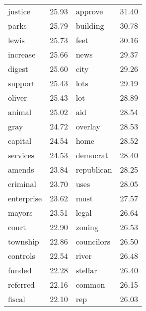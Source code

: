 \begin{table}[ht]
\begin{tabular}{lrlr}
  justice & 25.93 & approve & 31.40 \\ 
  parks & 25.79 & building & 30.78 \\ 
  lewis & 25.73 & feet & 30.16 \\ 
  increase & 25.66 & news & 29.37 \\ 
  digest & 25.60 & city & 29.26 \\ 
  support & 25.43 & lots & 29.19 \\ 
  oliver & 25.43 & lot & 28.89 \\ 
  animal & 25.02 & aid & 28.54 \\ 
  gray & 24.72 & overlay & 28.53 \\ 
  capital & 24.54 & home & 28.52 \\ 
  services & 24.53 & democrat & 28.40 \\ 
  amends & 23.84 & republican & 28.25 \\ 
  criminal & 23.70 & uses & 28.05 \\ 
  enterprise & 23.62 & must & 27.57 \\ 
  mayors & 23.51 & legal & 26.64 \\ 
  court & 22.90 & zoning & 26.53 \\ 
  township & 22.86 & councilors & 26.50 \\ 
  controls & 22.54 & river & 26.48 \\ 
  funded & 22.28 & stellar & 26.40 \\ 
  referred & 22.16 & common & 26.15 \\ 
  fiscal & 22.10 & rep & 26.03 \\ 
   \hline
\end{tabular}
\end{table}

